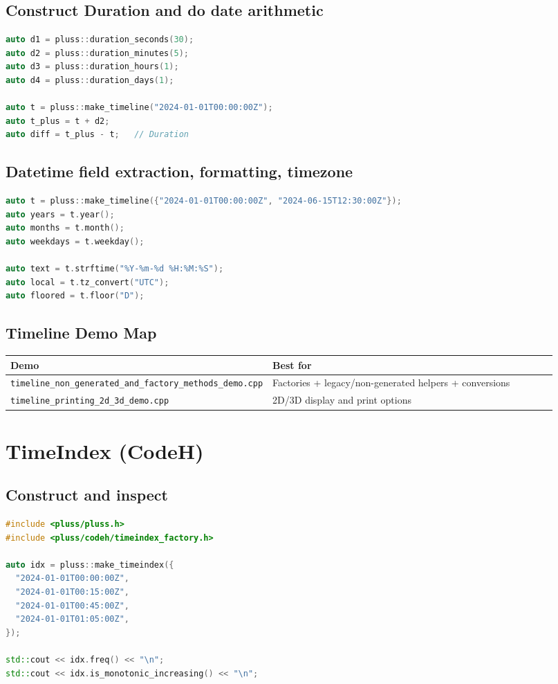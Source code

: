\documentclass[11pt]{article}
\begin{document}
\subsection{Construct Duration and do date arithmetic}
\begin{lstlisting}[language=C++]
auto d1 = pluss::duration_seconds(30);
auto d2 = pluss::duration_minutes(5);
auto d3 = pluss::duration_hours(1);
auto d4 = pluss::duration_days(1);

auto t = pluss::make_timeline("2024-01-01T00:00:00Z");
auto t_plus = t + d2;
auto diff = t_plus - t;   // Duration
\end{lstlisting}

\subsection{Datetime field extraction, formatting, timezone}
\begin{lstlisting}[language=C++]
auto t = pluss::make_timeline({"2024-01-01T00:00:00Z", "2024-06-15T12:30:00Z"});
auto years = t.year();
auto months = t.month();
auto weekdays = t.weekday();

auto text = t.strftime("%Y-%m-%d %H:%M:%S");
auto local = t.tz_convert("UTC");
auto floored = t.floor("D");
\end{lstlisting}

\subsection{Timeline Demo Map}
\begin{longtable}{@{}p{0.36\linewidth}p{0.56\linewidth}@{}}
\textbf{Demo} & \textbf{Best for} \\
\hline
\texttt{timeline\_non\_generated\_and\_factory\_methods\_demo.cpp} & Factories + legacy/non-generated helpers + conversions \\
\texttt{timeline\_printing\_2d\_3d\_demo.cpp} & 2D/3D display and print options \\
\end{longtable}

\section{TimeIndex (CodeH)}
\subsection{Construct and inspect}
\begin{lstlisting}[language=C++]
#include <pluss/pluss.h>
#include <pluss/codeh/timeindex_factory.h>

auto idx = pluss::make_timeindex({
  "2024-01-01T00:00:00Z",
  "2024-01-01T00:15:00Z",
  "2024-01-01T00:45:00Z",
  "2024-01-01T01:05:00Z",
});

std::cout << idx.freq() << "\n";
std::cout << idx.is_monotonic_increasing() << "\n";
\end{lstlisting}
\end{document}
